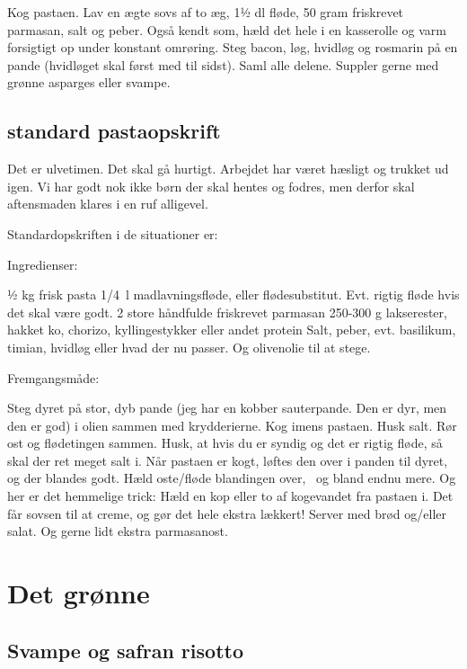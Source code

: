 \documentclass[
  letterpaper,
  DIV=11,
  numbers=noendperiod]{scrreprt}
\begin{document}
Kog pastaen. Lav en ægte sovs af to æg, 1½ dl fløde, 50 gram friskrevet
parmasan, salt og peber. Også kendt som, hæld det hele i en kasserolle
og varm forsigtigt op under konstant omrøring. Steg bacon, løg, hvidløg
og rosmarin på en pande (hvidløget skal først med til sidst). Saml alle
delene. Suppler gerne med grønne asparges eller svampe.

\hypertarget{standard-pastaopskrift}{%
\section{standard pastaopskrift}\label{standard-pastaopskrift}}

Det er ulvetimen. Det skal gå hurtigt. Arbejdet har været hæsligt og
trukket ud igen. Vi har godt nok ikke børn der skal hentes og fodres,
men derfor skal aftensmaden klares i en ruf alligevel.

Standardopskriften i de situationer er:

Ingredienser:

½ kg frisk pasta 1/4~l madlavningsfløde, eller flødesubstitut. Evt.
rigtig fløde hvis det skal være godt. 2 store håndfulde friskrevet
parmasan 250-300 g lakserester, hakket ko, chorizo, kyllingestykker
eller andet protein Salt, peber, evt. basilikum, timian, hvidløg eller
hvad der nu passer. Og olivenolie til at stege.

Fremgangsmåde:

Steg dyret på stor, dyb pande (jeg har en kobber sauterpande. Den er
dyr, men den er god) i olien sammen med krydderierne. Kog imens pastaen.
Husk salt. Rør ost og flødetingen sammen. Husk, at hvis du er syndig og
det er rigtig fløde, så skal der ret meget salt i. Når pastaen er kogt,
løftes den over i panden til dyret, og der blandes godt. Hæld oste/fløde
blandingen over, ~og bland endnu mere. Og her er det hemmelige trick:
Hæld en kop eller to af kogevandet fra pastaen i. Det får sovsen til at
creme, og gør det hele ekstra lækkert! Server med brød og/eller salat.
Og gerne lidt ekstra parmasanost.


\hypertarget{det-gruxf8nne}{%
\chapter{Det grønne}\label{det-gruxf8nne}}

\hypertarget{svampe-og-safran-risotto}{%
\section{Svampe og safran risotto}\label{svampe-og-safran-risotto}}
\end{document}
